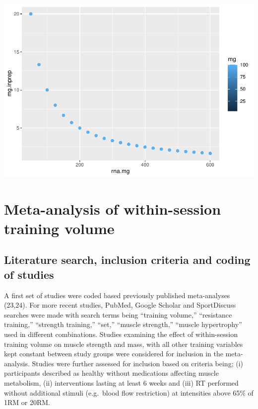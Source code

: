 \documentclass[twoside,10pt]{gihclass} %
\begin{document}
\includegraphics{thesis_files/figure-latex/unnamed-chunk-1-1.pdf}

\hypertarget{meta-analysis-of-within-session-training-volume}{%
\section{Meta-analysis of within-session training volume}\label{meta-analysis-of-within-session-training-volume}}

\hypertarget{literature-search-inclusion-criteria-and-coding-of-studies}{%
\subsection{Literature search, inclusion criteria and coding of studies}\label{literature-search-inclusion-criteria-and-coding-of-studies}}

A first set of studies were coded based previously published
meta-analyses (23,24). For more recent studies, PubMed, Google
Scholar and SportDiscuss searches were made with search terms being
``training volume,'' ``resistance training,'' ``strength training,'' ``set,''
``muscle strength,'' ``muscle hypertrophy'' used in different combinations.
Studies examining the effect of within-session training volume on muscle
strength and mass, with all other training variables kept constant
between study groups were considered for inclusion in the meta-analysis.
Studies were further assessed for inclusion based on criteria being; (i)
participants described as healthy without medications affecting muscle
metabolism, (ii) interventions lasting at least 6 weeks and (iii) RT
performed without additional stimuli (e.g.~blood flow restriction) at
intensities above 65\% of 1RM or 20RM.
\end{document}
